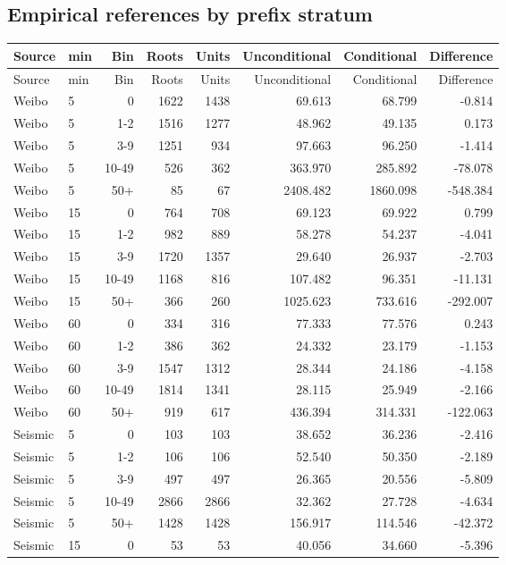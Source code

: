 \subsection{Empirical references by prefix stratum}
\footnotesize\begin{longtable}{llrrrrrr}\toprule Source & min & Bin & Roots & Units & Unconditional & Conditional & Difference\\\midrule\endfirsthead
\toprule Source & min & Bin & Roots & Units & Unconditional & Conditional & Difference\\\midrule\endhead
Weibo & 5 & 0 & 1622 & 1438 & 69.613 & 68.799 & -0.814\\
Weibo & 5 & 1-2 & 1516 & 1277 & 48.962 & 49.135 & 0.173\\
Weibo & 5 & 3-9 & 1251 & 934 & 97.663 & 96.250 & -1.414\\
Weibo & 5 & 10-49 & 526 & 362 & 363.970 & 285.892 & -78.078\\
Weibo & 5 & 50+ & 85 & 67 & 2408.482 & 1860.098 & -548.384\\
Weibo & 15 & 0 & 764 & 708 & 69.123 & 69.922 & 0.799\\
Weibo & 15 & 1-2 & 982 & 889 & 58.278 & 54.237 & -4.041\\
Weibo & 15 & 3-9 & 1720 & 1357 & 29.640 & 26.937 & -2.703\\
Weibo & 15 & 10-49 & 1168 & 816 & 107.482 & 96.351 & -11.131\\
Weibo & 15 & 50+ & 366 & 260 & 1025.623 & 733.616 & -292.007\\
Weibo & 60 & 0 & 334 & 316 & 77.333 & 77.576 & 0.243\\
Weibo & 60 & 1-2 & 386 & 362 & 24.332 & 23.179 & -1.153\\
Weibo & 60 & 3-9 & 1547 & 1312 & 28.344 & 24.186 & -4.158\\
Weibo & 60 & 10-49 & 1814 & 1341 & 28.115 & 25.949 & -2.166\\
Weibo & 60 & 50+ & 919 & 617 & 436.394 & 314.331 & -122.063\\
Seismic & 5 & 0 & 103 & 103 & 38.652 & 36.236 & -2.416\\
Seismic & 5 & 1-2 & 106 & 106 & 52.540 & 50.350 & -2.189\\
Seismic & 5 & 3-9 & 497 & 497 & 26.365 & 20.556 & -5.809\\
Seismic & 5 & 10-49 & 2866 & 2866 & 32.362 & 27.728 & -4.634\\
Seismic & 5 & 50+ & 1428 & 1428 & 156.917 & 114.546 & -42.372\\
Seismic & 15 & 0 & 53 & 53 & 40.056 & 34.660 & -5.396\\

\end{longtable}
